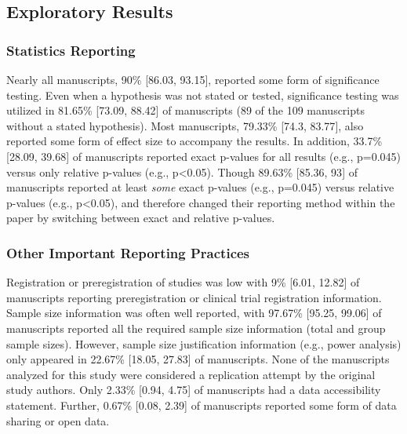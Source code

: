 \documentclass[]{cik}%
\begin{document}
\newpage

\hypertarget{exploratory-results}{%
\subsection{Exploratory Results}\label{exploratory-results}}

\hypertarget{statistics-reporting}{%
\subsubsection{Statistics Reporting}\label{statistics-reporting}}

Nearly all manuscripts, 90\% {[}86.03, 93.15{]}, reported some form of
significance testing. Even when a hypothesis was not stated or tested,
significance testing was utilized in 81.65\% {[}73.09, 88.42{]} of
manuscripts (89 of the 109 manuscripts without a stated hypothesis).
Most manuscripts, 79.33\% {[}74.3, 83.77{]}, also reported some form of
effect size to accompany the results. In addition, 33.7\% {[}28.09,
39.68{]} of manuscripts reported exact p-values for all results (e.g.,
p=0.045) versus only relative p-values (e.g., p\textless0.05). Though
89.63\% {[}85.36, 93{]} of manuscripts reported at least \emph{some}
exact p-values (e.g., p=0.045) versus relative p-values (e.g.,
p\textless0.05), and therefore changed their reporting method within the
paper by switching between exact and relative p-values.

\hypertarget{other-important-reporting-practices}{%
\subsubsection{Other Important Reporting
Practices}\label{other-important-reporting-practices}}

Registration or preregistration of studies was low with 9\% {[}6.01,
12.82{]} of manuscripts reporting preregistration or clinical trial
registration information. Sample size information was often well
reported, with 97.67\% {[}95.25, 99.06{]} of manuscripts reported all
the required sample size information (total and group sample sizes).
However, sample size justification information (e.g., power analysis)
only appeared in 22.67\% {[}18.05, 27.83{]} of manuscripts. None of the
manuscripts analyzed for this study were considered a replication
attempt by the original study authors. Only 2.33\% {[}0.94, 4.75{]} of
manuscripts had a data accessibility statement. Further, 0.67\% {[}0.08,
2.39{]} of manuscripts reported some form of data sharing or open data.
\end{document}
